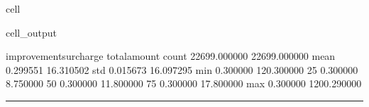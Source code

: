 \documentclass[letterpaper,10pt,english]{sphinxmanual}
\begin{document}
\begin{sphinxuseclass}{cell}
\begin{sphinxuseclass}{cell_output}
\begin{sphinxVerbatim}[commandchars=\\\{\}]
       improvement\PYGZus{}surcharge  total\PYGZus{}amount  
count           22699.000000  22699.000000  
mean                0.299551     16.310502  
std                 0.015673     16.097295  
min                \PYGZhy{}0.300000   \PYGZhy{}120.300000  
25\PYGZpc{}                 0.300000      8.750000  
50\PYGZpc{}                 0.300000     11.800000  
75\PYGZpc{}                 0.300000     17.800000  
max                 0.300000   1200.290000  
\end{sphinxVerbatim}

\end{sphinxuseclass}
\end{sphinxuseclass}

\bigskip\hrule\bigskip


\sphinxAtStartPar
{}
\end{document}
